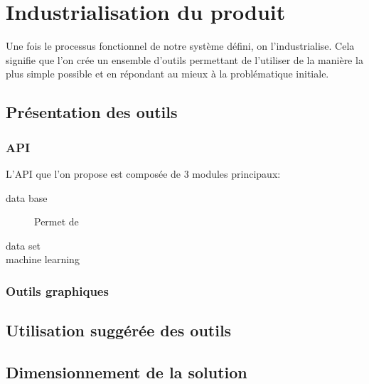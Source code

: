 \chapter{Industrialisation du produit}
\label{Industrialisation du produit}
\thispagestyle{fancy}
Une fois le processus fonctionnel de notre système défini, on l'industrialise. Cela signifie que l'on crée un ensemble d'outils permettant de l'utiliser de la manière la plus simple possible et en répondant au mieux à la problématique initiale. 

\section{Présentation des outils}
\label{Industrialisation du produit: Présentation des outils}


\subsection{API}
\label{Industrialisation du produit: Présentation des outils:API}
L'API que l'on propose est composée de 3 modules principaux:
\begin{description}
	\item [data base] Permet de 
	\item [data set]
	\item [machine learning]
\end{description}

\subsection{Outils graphiques}
\label{Industrialisation du produit: Présentation des outils: Outils graphiques}

\section{Utilisation suggérée des outils}
\label{Industrialisation du produit: Utilisation suggérée des outils}

\section{Dimensionnement de la solution}
\label{Industrialisation du produit: Dimensionnement de la solution}
